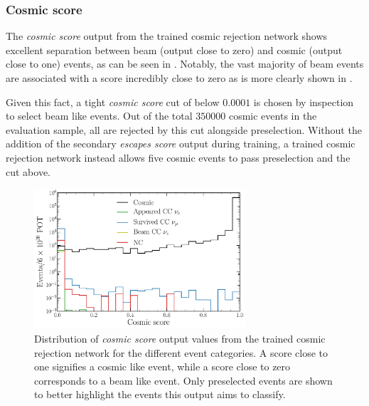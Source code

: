 \subsubsection*{Cosmic score} %

The \emph{cosmic score} output from the trained cosmic rejection network shows excellent
separation between beam (output close to zero) and cosmic (output close to one) events, as can be
seen in . Notably, the vast majority of beam events are associated
with a score incredibly close to zero as is more clearly shown in
. 

Given this fact, a tight \emph{cosmic score} cut of below $0.0001$ is chosen by inspection to
select beam like events. Out of the total $350000$ cosmic events in the evaluation sample, all are
rejected by this cut alongside preselection. Without the addition of the secondary \emph{escapes
score} output during training, a trained cosmic rejection network instead allows five cosmic
events to pass preselection and the cut above.

\begin{figure} %
    \includegraphics[width=0.7\textwidth]{diagrams/7-results/final_cosmic_outputs.pdf}
    \caption[Distribution of cosmic score output values]
    {Distribution of \emph{cosmic score} output values from the trained cosmic rejection network
        for the different event categories. A score close to one signifies a cosmic like event,
        while a score close to zero corresponds to a beam like event. Only preselected events are
        shown to better highlight the events this output aims to classify.}
    \label{fig:cosmic_outputs}
\end{figure}

